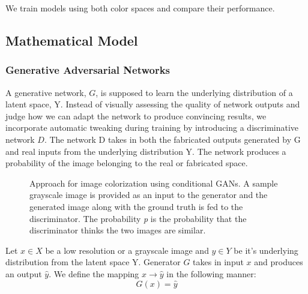 \documentclass{article} %
\begin{document}
    We train models using both color spaces and compare their performance.
    \subsection{Mathematical Model}
    \subsubsection{Generative Adversarial Networks}
     A generative network, $G$, is supposed to learn the underlying distribution of a latent space, Y. Instead of visually assessing the quality of network outputs and judge how we can adapt the network to produce convincing results, we incorporate automatic tweaking during training by introducing a discriminative network $D$. The network D takes in both the fabricated outputs generated by G and real inputs from the underlying distribution Y. The network produces a probability of the image belonging to the real or fabricated space.
    \begin{figure}[!htb]
        \centering
        \resizebox{\textwidth}{!}{
        }
        \caption{Approach for image colorization using conditional GANs. A sample grayscale image is provided as an input to the generator and the generated image along with the ground truth is fed to the discriminator. The probability \textit{p} is the probability that the discriminator thinks the two images are similar.}
        \label{fig:gan_visualization}
    \end{figure}
      Let $x \in X$ be a low resolution or a grayscale image and $y \in Y$ be it's underlying distribution from the latent space Y. Generator $G$ takes in input $x$ and produces an output $\hat{y}$. We define the mapping $x \rightarrow \hat{y}$ in the following manner:
      $$G(x) = \hat{y}$$
    
\end{document}
